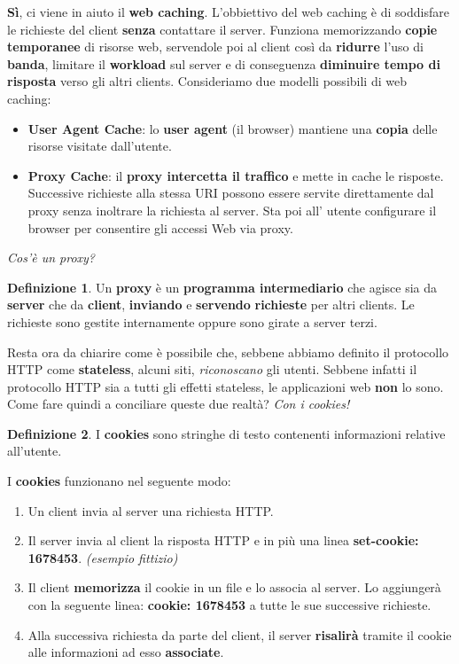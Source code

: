 \documentclass[11pt,a4paper]{article}
\theoremstyle{definition}
\newtheorem{definition}{Definizione}[section]
\begin{document}
\textbf{Sì}, ci viene in aiuto il \textbf{web caching}. L'obbiettivo del web caching è di soddisfare le richieste del client \textbf{senza} contattare il server. Funziona memorizzando \textbf{copie temporanee} di risorse web, servendole poi al client così da \textbf{ridurre} l’uso di \textbf{banda}, limitare il \textbf{workload} sul server e di conseguenza \textbf{diminuire tempo di risposta} verso gli altri clients.\newline
Consideriamo due modelli possibili di web caching:
\begin{itemize}
	\item \textbf{User Agent Cache}: lo \textbf{user agent} (il browser) mantiene una \textbf{copia} delle risorse visitate dall’utente.
	\item \textbf{Proxy Cache}: il \textbf{proxy intercetta il traffico} e mette in cache le risposte. Successive richieste alla stessa URI possono essere servite direttamente dal proxy senza inoltrare la richiesta al server. Sta poi all' utente configurare il browser per consentire gli accessi Web via proxy.
\end{itemize}

\textit{Cos'è un proxy?}
\theoremstyle{definition}
\begin{definition}
	Un \textbf{proxy} è un \textbf{programma intermediario} che agisce sia da \textbf{server} che da \textbf{client}, \textbf{inviando} e \textbf{servendo} \textbf{richieste} per altri clients. Le richieste sono gestite internamente oppure sono girate a server terzi.
\end{definition}
Resta ora da chiarire come è possibile che, sebbene abbiamo definito il protocollo HTTP come \textbf{stateless}, alcuni siti, \textit{riconoscano} gli utenti.\newline
Sebbene infatti il protocollo HTTP sia a tutti gli effetti stateless, le applicazioni web \textbf{non} lo sono. Come fare quindi a conciliare queste due realtà?\newline\newline
\textit{Con i cookies!}
\begin{definition}
	I \textbf{cookies} sono stringhe di testo contenenti informazioni relative all'utente.
\end{definition}
I \textbf{cookies} funzionano nel seguente modo:
\begin{enumerate}
	\item Un client invia al server una richiesta HTTP.
	\item Il server invia al client la risposta HTTP e in più una linea \textbf{set-cookie: 1678453}. \textit{(esempio fittizio)}
	\item Il client \textbf{memorizza} il cookie in un file e lo associa al server.
	      Lo aggiungerà con la seguente linea: \textbf{cookie: 1678453} a tutte le sue successive richieste.
	\item Alla successiva richiesta da parte del client, il server \textbf{risalirà} tramite il cookie alle informazioni ad esso \textbf{associate}.
\end{enumerate}
\newpage
\end{document}
